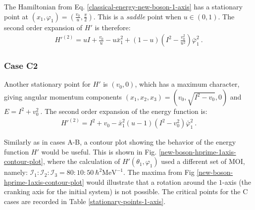 The Hamiltonian from Eq. \ref{classical-energy-new-boson-1-axis} has a stationary point at $(x_1,\varphi_1)=\left(\frac{v_0}{u},\frac{\pi}{2}\right)$. This is a \emph{saddle} point when $u\in(0,1)$. The second order expansion of $H'$ is therefore:
\begin{align}
    H'^{(2)}=uI+\frac{v_0}{u}-u\bar{x}_1^2+(1-u)\left(I^2-\frac{v_0^2}{u^2}\right)\bar{\varphi}_1^2\ .
\end{align}

\subsubsection*{Case C2}

Another stationary point for $H'$ is $(v_0,0)$, which has a maximum character, giving angular momentum components $(x_1,x_2,x_3)=(v_0,\sqrt{I^2-v_0},0)$ and $E=I^2+v_0^2\ .$ The second order expansion of the energy function is:
\begin{align}
    H'^{(2)}=I^2+v_0-\bar{x}_1^2(u-1)\left(I^2-v_0^2\right)\bar{\varphi}_1^2\ .
\end{align}

Similarly as in cases A-B, a contour plot showing the behavior of the energy function $H'$ would be useful. This is shown in Fig. \ref{new-boson-hprime-1axis-contour-plot}, where the calculation of $H'(\theta_1,\varphi_1)$ used a different set of MOI, namely: $\mathcal{I}_1:\mathcal{I}_2:\mathcal{I}_3=80:10:50\ \hbar^2\text{MeV}^{-1}$. The maxima from Fig \ref{new-boson-hprime-1axis-contour-plot} would illustrate that a rotation around the $1$-axis (the cranking axis for the initial system) is not possible. The critical points for the C cases are recorded in Table \ref{stationary-points-1-axis}.
\begin{table}
    \centering
    \caption{The stationary points for the classical energy function depicted in Eq. \ref{new-boson-h-prime-classical}, when the quantization axis is the $1$-axis. Each point corresponds to the cases $C1$, and $C2$, respectively.}
    \label{stationary-points-1-axis}
\end{table}

